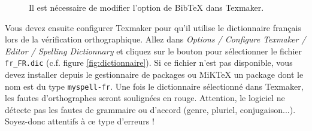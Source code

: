 \documentclass{ceri}
\begin{document}
\begin{figure}[htb]
	\centering
	\caption{Il est nécessaire de modifier l'option de BibTeX dans Texmaker.}
	\label{fig:bibtex}
\end{figure}

Vous devez ensuite configurer Texmaker pour qu'il utilise le dictionnaire français lors de la vérification orthographique. Allez dans \textit{Options / Configure Texmaker / Editor / Spelling Dictionnary} et cliquez sur le bouton pour sélectionner le fichier \texttt{fr\_FR.dic} (c\@.f\@. figure \ref{fig:dictionnaire}). Si ce fichier n'est pas disponible, vous devez installer depuis le gestionnaire de packages ou MiKTeX un package dont le nom est du type \texttt{myspell-fr}. Une fois le dictionnaire sélectionné dans Texmaker, les fautes d'orthographes seront soulignées en rouge. Attention, le logiciel ne détecte pas les fautes de grammaire ou d'accord (genre, pluriel, conjugaison...). Soyez-donc attentifs à ce type d'erreurs !
\end{document}
